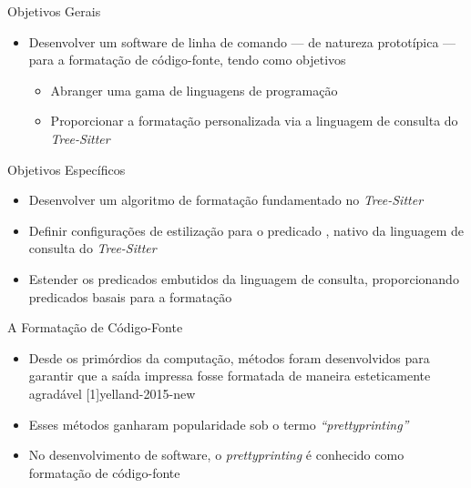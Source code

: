 \documentclass
  [ aspectratio=169,
    english,
    hyperref={citecolor=blue,colorlinks=true,linkcolor=blue,urlcolor=blue},
    brazil]
  {beamer}
\newcommand{\treesitter}{\textit{Tree-Sitter}\xspace}
\begin{document}

  \begin{frame}{Objetivos Gerais}
    \begin{itemize}
      \item Desenvolver um software de linha de comando --- de natureza
            prototípica --- para a formatação de código-fonte, tendo como
            objetivos
            \begin{itemize}
              \item Abranger uma gama de linguagens de programação
              \item Proporcionar a formatação personalizada via a linguagem de
                    consulta do \treesitter
            \end{itemize}
    \end{itemize}
  \end{frame}


  \begin{frame}[fragile]{Objetivos Específicos}
    \begin{itemize}
      \item Desenvolver um algoritmo de formatação fundamentado no \treesitter
      \item Definir configurações de estilização para o predicado
            , nativo da linguagem de consulta do
            \treesitter
      \item Estender os predicados embutidos da linguagem de consulta,
            proporcionando predicados basais para a formatação
    \end{itemize}
  \end{frame}


  \begin{frame}{A Formatação de Código-Fonte}
    \begin{itemize}
      \item Desde os primórdios da computação, métodos foram desenvolvidos para
            garantir que a saída impressa fosse formatada de maneira
            esteticamente agradável
            [1]{yelland-2015-new}
      \item Esses métodos ganharam popularidade sob o termo
            \textit{``prettyprinting''}
      \item No desenvolvimento de software, o \textit{prettyprinting} é
            conhecido como formatação de código-fonte
    \end{itemize}
  \end{frame}
\end{document}
